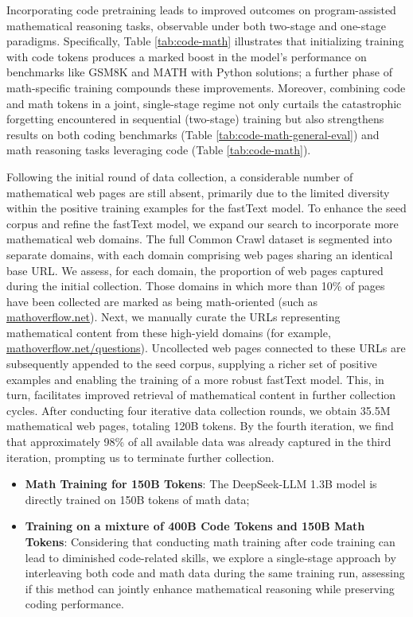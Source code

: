 Incorporating code pretraining leads to improved outcomes on program-assisted mathematical reasoning tasks, observable under both two-stage and one-stage paradigms. Specifically, Table \ref{tab:code-math} illustrates that initializing training with code tokens produces a marked boost in the model’s performance on benchmarks like GSM8K and MATH with Python solutions; a further phase of math-specific training compounds these improvements. Moreover, combining code and math tokens in a joint, single-stage regime not only curtails the catastrophic forgetting encountered in sequential (two-stage) training but also strengthens results on both coding benchmarks (Table \ref{tab:code-math-general-eval}) and math reasoning tasks leveraging code (Table \ref{tab:code-math}).

Following the initial round of data collection, a considerable number of mathematical web pages are still absent, primarily due to the limited diversity within the positive training examples for the fastText model. To enhance the seed corpus and refine the fastText model, we expand our search to incorporate more mathematical web domains. The full Common Crawl dataset is segmented into separate domains, with each domain comprising web pages sharing an identical base URL. We assess, for each domain, the proportion of web pages captured during the initial collection. Those domains in which more than 10\% of pages have been collected are marked as being math-oriented (such as \url{mathoverflow.net}).
Next, we manually curate the URLs representing mathematical content from these high-yield domains (for example, \url{mathoverflow.net/questions}).
Uncollected web pages connected to these URLs are subsequently appended to the seed corpus, supplying a richer set of positive examples and enabling the training of a more robust fastText model. This, in turn, facilitates improved retrieval of mathematical content in further collection cycles. After conducting four iterative data collection rounds, we obtain 35.5M mathematical web pages, totaling 120B tokens. By the fourth iteration, we find that approximately 98\% of all available data was already captured in the third iteration, prompting us to terminate further collection.

\begin{itemize}[topsep=0pt]
    \item \textbf{Math Training for 150B Tokens}: The DeepSeek-LLM 1.3B model is directly trained on 150B tokens of math data;
    \item \textbf{Training on a mixture of 400B Code Tokens and 150B Math Tokens}: Considering that conducting math training after code training can lead to diminished code-related skills, we explore a single-stage approach by interleaving both code and math data during the same training run, assessing if this method can jointly enhance mathematical reasoning while preserving coding performance.
\end{itemize}

